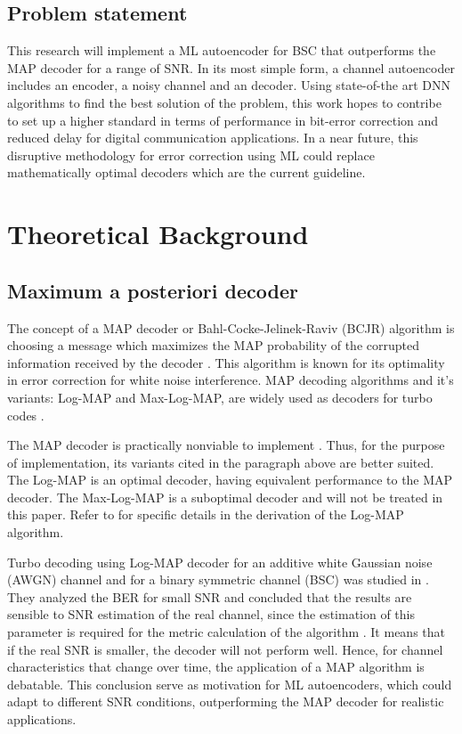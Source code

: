 \documentclass[conference]{IEEEtran}
\begin{document}
\subsection{Problem statement}

This research will implement a ML autoencoder for BSC that outperforms the MAP decoder for a range of SNR. In its most simple form, a channel autoencoder includes an encoder, a noisy channel and an decoder. Using state-of-the art DNN algorithms to find the best solution of the problem, this work hopes to contribe to set up a higher standard in terms of performance in bit-error correction and reduced delay for digital communication applications. In a near future, this disruptive methodology for error correction using ML could replace mathematically optimal decoders which are the current guideline.



\section{Theoretical Background}


\subsection{Maximum a posteriori decoder}


The concept of a MAP decoder or Bahl-Cocke-Jelinek-Raviv (BCJR) algorithm is choosing a message which maximizes the MAP probability of the corrupted information received  by the decoder \cite{b4}. This algorithm is known for its optimality in error correction for white noise interference. MAP decoding algorithms and it's variants: Log-MAP and Max-Log-MAP, are widely used as decoders for turbo codes \cite{b7}. 

The MAP decoder is practically nonviable to implement \cite{b6}. Thus, for the purpose of implementation, its variants cited in the paragraph above are better suited. The Log-MAP is an optimal decoder, having equivalent performance to the MAP decoder. The Max-Log-MAP is a suboptimal decoder and will not be treated in this paper. Refer to \cite{b6} for specific details in the derivation of the Log-MAP algorithm.

Turbo decoding using Log-MAP decoder for an additive white Gaussian noise (AWGN) channel and for a binary symmetric channel (BSC) was studied in \cite{b5}. They analyzed the BER for small SNR and concluded that the results are sensible to SNR estimation of the real channel, since the estimation of this parameter is required for the metric calculation of the algorithm \cite{b6}. It means that if the real SNR is smaller, the decoder will not perform well. Hence, for channel characteristics that change over time, the application of a MAP algorithm is debatable. This conclusion serve as motivation for ML autoencoders, which could adapt to different SNR conditions, outperforming the MAP decoder for realistic applications.
\end{document}
